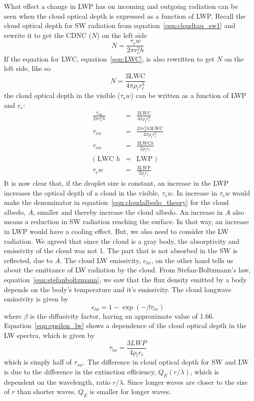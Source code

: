 What effect a change in LWP has on incoming and outgoing radiation can be seen when the cloud optical depth is expressed as a function of LWP. Recall the cloud optical depth for SW radiation %
from equation~\ref{eqn:cloudtau_sw1} and rewrite it to get the CDNC ($N$) on the left side
\begin{equation}
N = \frac{\tau_sw}{2\pi r^2_e h}
\end{equation}
If the equation for LWC, equation~\ref{eqn:LWC}, is also rewritten to get $N$ on the left side, like so
\begin{equation}
N = \frac{3\text{LWC}}{4\pi \rho_l r^3_e}
\end{equation}
the cloud optical depth in the visible ($\tau_sw$) can be written as a function of LWP and $r_e$:
\begin{eqnarray}
\frac{\tau_{sw}}{2\pi r^2_e h} &=& \frac{3\text{LWC}}{4\pi \rho_l r^3_e}\\
\tau_{sw} &=& \frac{2\pi r^2_3 h 3\text{LWC}}{4\pi \rho_l r^3_e}\\
\tau_{sw} &=& \frac{3\text{LWC} h}{2\rho_l r_e}\\
\text{( LWC }h &=& \text{LWP )}\\
\tau_sw &=& \frac{3\text{LWP}}{2\rho_l r_e}
\label{eqn:cloudtau_sw}
\end{eqnarray}
It is now clear that, if the droplet size is constant, an increase in the LWP increases the optical depth of a cloud in the visible, $\tau_sw$. In increase in $\tau_sw$ would make the denominator in equation~\ref{eqn:cloudalbedo_theory} for the cloud albedo, $A$, smaller and thereby increase the cloud albedo. An increase in $A$ also means a reduction in SW radiation reaching the surface. In that way, an increase in LWP would have a cooling effect. But, we also need to consider the LW radiation. We agreed that since the cloud is a gray body, the absorptivity and emissivity of the cloud was not 1. The part that is not absorbed in the SW is reflected, due to $A$. The cloud LW emissivity, $\epsilon_{lw}$, on the other hand tells us about the emittance of LW radiation by the cloud. From Stefan-Boltzmann's law, equation~\ref{eqn:stefanboltzmann}, we saw that the flux density emitted by a body depends on the body's temperature and it's emissivity. The cloud longwave emissivity is given by
\begin{equation}
\epsilon_{lw} = 1 - \exp(-\beta \tau_{lw})
\label{eqn:epsilon_lw}
\end{equation}
where $\beta$ is the diffusivity factor, having an approximate value of 1.66. Equation~\ref{eqn:epsilon_lw} shows a dependence of the cloud optical depth in the LW spectra, which is given by
\begin{equation}
\tau_{lw} = \frac{3LWP}{4\rho_l r_e}
\end{equation}
which is simply half of $\tau_{sw}$. The difference in cloud optical depth for SW and LW is due to the difference in the extinction efficiency, $Q_E(r/\lambda)$, which is dependent on the wavelength, ratio $r/\lambda$. Since longer waves are closer to the size of $r$ than shorter waves, $Q_E$ is smaller for longer waves.

